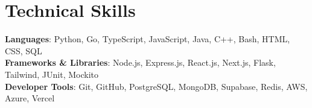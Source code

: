 \section{Technical Skills}
\begin{itemize}[leftmargin=0.15in, label={}]
    \small{\item{     
        \textbf{Languages}{: Python, Go, TypeScript, JavaScript, Java, C++, Bash, HTML, CSS, SQL} \\
     
        \textbf{Frameworks \& Libraries}{: Node.js, Express.js, React.js, Next.js, Flask, Tailwind, JUnit, Mockito} \\

        \textbf{Developer Tools}{: Git, GitHub, PostgreSQL, MongoDB, Supabase, Redis, AWS, Azure, Vercel} \\
    }}
\end{itemize}